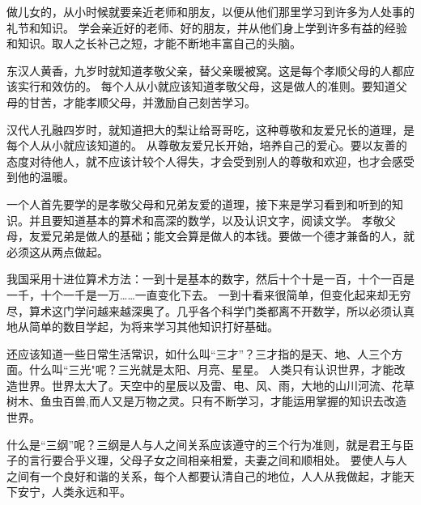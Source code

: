 \documentclass[avery5371,grid]{flashcards}
\begin{document}
{做儿女的，从小时候就要亲近老师和朋友，以便从他们那里学习到许多为人处事的礼节和知识。} %
{学会亲近好的老师、好的朋友，并从他们身上学到许多有益的经验和知识。取人之长补己之短，才能不断地丰富自己的头脑。} %

{东汉人黄香，九岁时就知道孝敬父亲，替父亲暖被窝。这是每个孝顺父母的人都应该实行和效仿的。} %
{每个人从小就应该知道孝敬父母，这是做人的准则。要知道父母的甘苦，才能孝顺父母，并激励自己刻苦学习。} %

{汉代人孔融四岁时，就知道把大的梨让给哥哥吃，这种尊敬和友爱兄长的道理，是每个人从小就应该知道的。} %
{从尊敬友爱兄长开始，培养自己的爱心。要以友善的态度对待他人，就不应该计较个人得失，才会受到别人的尊敬和欢迎，也才会感受到他的温暖。} %

{一个人首先要学的是孝敬父母和兄弟友爱的道理，接下来是学习看到和听到的知识。并且要知道基本的算术和高深的数学，以及认识文字，阅读文学。} %
{孝敬父母，友爱兄弟是做人的基础；能文会算是做人的本钱。要做一个德才兼备的人，就必须这从两点做起。} %

{我国采用十进位算术方法：一到十是基本的数字，然后十个十是一百，十个一百是一千，十个一千是一万……一直变化下去。} %
{一到十看来很简单，但变化起来却无穷尽，算术这门学问越来越深奥了。几乎各个科学门类都离不开数学，所以必须认真地从简单的数目学起，为将来学习其他知识打好基础。} %

{还应该知道一些日常生活常识，如什么叫“三才”？三才指的是天、地、人三个方面。什么叫“三光"呢？三光就是太阳、月亮、星星。} %
{人类只有认识世界，才能改造世界。世界太大了。天空中的星辰以及雷、电、风、雨，大地的山川河流、花草树木、鱼虫百兽,而人又是万物之灵。只有不断学习，才能运用掌握的知识去改造世界。} %

{什么是“三纲”呢？三纲是人与人之间关系应该遵守的三个行为准则，就是君王与臣子的言行要合乎义理，父母子女之间相亲相爱，夫妻之间和顺相处。} %
{要使人与人之间有一个良好和谐的关系，每个人都要认清自己的地位，人人从我做起，才能天下安宁，人类永远和平。} %
\end{document}
